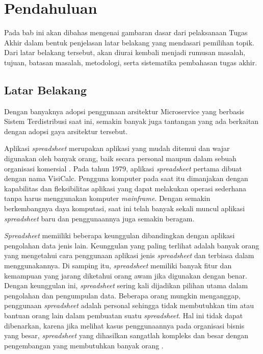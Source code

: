 \chapter{Pendahuluan}

Pada bab ini akan dibahas mengenai gambaran dasar dari pelaksanaan Tugas Akhir dalam bentuk penjelasan latar belakang yang mendasari pemilihan topik. Dari latar belakang tersebut, akan diurai kembali menjadi rumusan masalah, tujuan, batasan masalah, metodologi, serta sistematika pembahasan tugas akhir.                                                                        

\section{Latar Belakang}

Dengan banyaknya adopsi penggunaan arsitektur Microservice yang berbasis Sistem Terdistribusi saat ini, semakin banyak juga tantangan yang ada berkaitan dengan adopsi gaya arsitektur tersebut. 

Aplikasi \textit{spreadsheet} merupakan aplikasi yang mudah ditemui dan wajar digunakan oleh banyak orang, baik secara personal maupun dalam sebuah organisasi komersial \citep{Chan1996}. Pada tahun 1979, aplikasi \textit{spreadsheet} pertama dibuat dengan nama VisiCalc. Pengguna komputer pada saat itu dimanjakan dengan kapabilitas dan fleksibilitas aplikasi yang dapat melakukan operasi sederhana tanpa harus menggunakan komputer \textit{mainframe}. Dengan semakin berkembangnya daya komputasi, saat ini telah banyak sekali muncul aplikasi \textit{spreadsheet} baru dan penggunaannya juga semakin beragam.

\textit{Spreadsheet} memiiliki beberapa keunggulan dibandingkan dengan aplikasi pengolahan data jenis lain. Keunggulan yang paling terlihat adalah banyak orang yang mengetahui cara penggunaan aplikasi jenis \textit{spreadsheet} dan terbiasa dalam menggunakannya. Di samping itu, \textit{spreadsheet} memiliki banyak fitur dan kemampuan yang jarang diketahui orang awam jika digunakan dengan benar. Dengan keunggulan ini, \textit{spreadsheet} sering kali dijadikan pilihan utama dalam pengolahan dan pengumpulan data. Beberapa orang mungkin menganggap, penggunaan \textit{spreadsheet} adalah personal sehingga tidak membutuhkan tim atau bantuan orang lain dalam pembuatan suatu \textit{spreadsheet}. Hal ini tidak dapat dibenarkan, karena jika melihat kasus penggunaannya pada organisasi bisnis yang besar, \textit{spreadsheet} yang dihasilkan sangatlah kompleks dan besar dengan pengembangan yang membutuhkan banyak orang \citep{Panko1998}.

